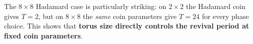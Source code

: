 \noindent The $8\times8$ Hadamard case is particularly striking: on
$2\times2$ the Hadamard coin gives $T=2$, but on $8\times8$ the
\emph{same} coin parameters give $T=24$ for every phase choice. This
shows that \textbf{torus size directly controls the revival period at
fixed coin parameters}.
